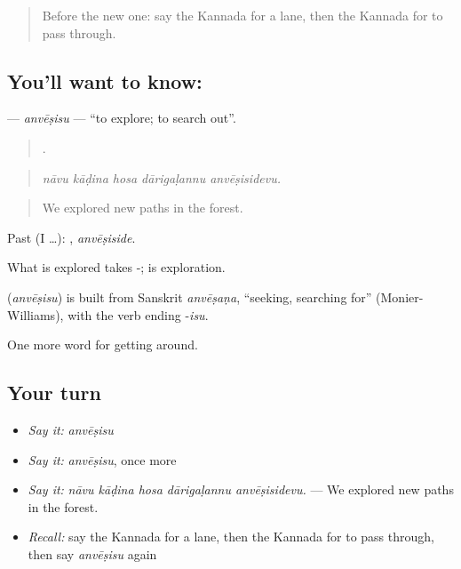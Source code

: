 \label{lesson:KA-C457-anvesisu}



\begin{quote}
Before the new one: say the Kannada for a lane, then the Kannada for to pass through.
\end{quote}

\subsection*{You'll want to know: }
\textbf{} — \emph{anvēṣisu} — \textquotedblleft{}to explore; to search out\textquotedblright{}.

\begin{quote}
    .
\end{quote}

\begin{quote}
\emph{nāvu kāḍina hosa dārigaḷannu anvēṣisidevu.}
\end{quote}

\begin{quote}
We explored new paths in the forest.
\end{quote}

Past (I …): , \emph{anvēṣiside}.

What is explored takes -;  is exploration.

\begin{cousinweb}
\textbf{} (\emph{anvēṣisu}) is built from Sanskrit \emph{anvēṣaṇa}, \textquotedblleft{}seeking, searching for\textquotedblright{} (Monier-Williams), with the verb ending -\emph{isu}.
\end{cousinweb}

\begin{grammarlens}[title={What you've built}]
One more word for getting around.
\end{grammarlens}

\subsection*{Your turn}
\begin{itemize}
\raggedright
  \item \emph{Say it:} \emph{anvēṣisu}
  \item \emph{Say it:} \emph{anvēṣisu}, once more
  \item \emph{Say it:} \emph{nāvu kāḍina hosa dārigaḷannu anvēṣisidevu.} — We explored new paths in the forest.
  \item \emph{Recall:} say the Kannada for a lane, then the Kannada for to pass through, then say \emph{anvēṣisu} again
\end{itemize}

